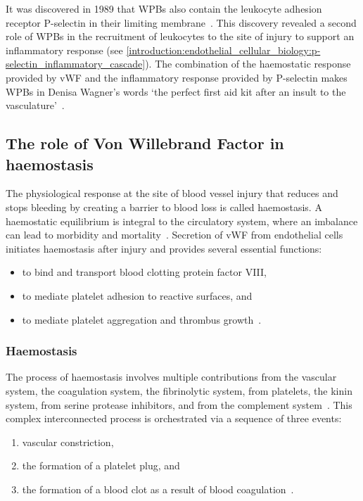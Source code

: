 It was discovered in 1989 that WPBs also contain the leukocyte adhesion receptor P-selectin in their limiting membrane~\cite{Bonfanti1989,McEver1989}. This discovery revealed a second role of WPBs in the recruitment of leukocytes to the site of injury to support an inflammatory response (see \autoref{introduction:endothelial_cellular_biology:p-selectin_inflammatory_cascade}). The combination of the haemostatic response provided by vWF and the inflammatory response provided by P-selectin makes WPBs in Denisa Wagner's words `the perfect first aid kit after an insult to the vasculature'~\cite{Weibel2012}.

\subsection{The role of Von Willebrand Factor in haemostasis}
\label{introduction:endothelial_cellular_biology:vwf_in_haemostasis}
The physiological response at the site of blood vessel injury that reduces and stops bleeding by creating a barrier to blood loss is called haemostasis. A haemostatic equilibrium is integral to the circulatory system, where an imbalance can lead to morbidity and mortality~\cite{Rasche2001}. Secretion of vWF from endothelial cells initiates haemostasis after injury and provides several essential functions:
\begin{itemize}
\item to bind and transport blood clotting protein factor VIII,
\item to mediate platelet adhesion to reactive surfaces, and
\item to mediate platelet aggregation and thrombus growth~\cite{Ruggeri2007}.
\end{itemize}


\subsubsection{Haemostasis}
The process of haemostasis involves multiple contributions from the vascular system, the coagulation system, the fibrinolytic system, from platelets, the kinin system, from serine protease inhibitors, and from the complement system~\cite{Boon1993}. This complex interconnected process is orchestrated via a sequence of three events:
\begin{enumerate}
\item vascular constriction,
\item the formation of a platelet plug, and
\item the formation of a blood clot as a result of blood coagulation~\cite{Hall2011}.
\end{enumerate}


